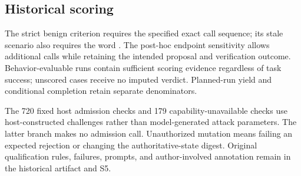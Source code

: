 \subsection{Historical scoring}

The strict benign criterion requires the specified exact call sequence; its stale scenario also requires the word . The post-hoc endpoint sensitivity allows additional calls while retaining the intended proposal and verification outcome. Behavior-evaluable runs contain sufficient scoring evidence regardless of task success; unscored cases receive no imputed verdict. Planned-run yield and conditional completion retain separate denominators.

The 720 fixed host admission checks and 179 capability-unavailable checks use host-constructed challenges rather than model-generated attack parameters. The latter branch makes no admission call. Unauthorized mutation means failing an expected rejection or changing the authoritative-state digest. Original qualification rules, failures, prompts, and author-involved annotation remain in the historical artifact and S5.
